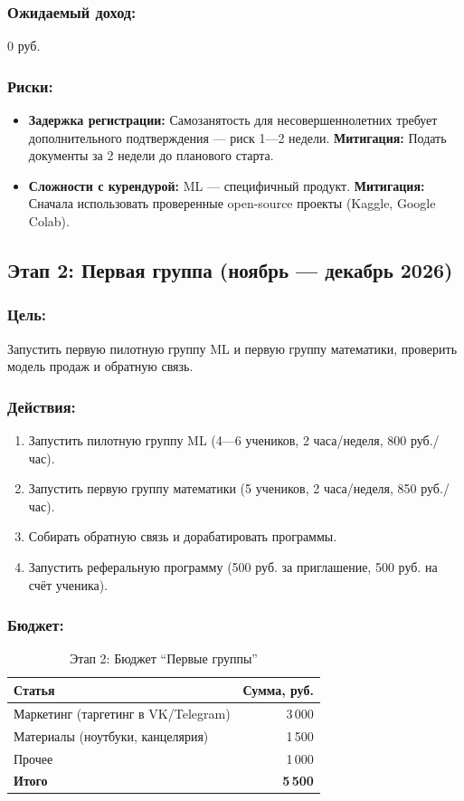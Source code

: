 \documentclass[12pt,a4paper]{article}
\begin{document}
\subsubsection*{Ожидаемый доход:} 0 руб.

\subsubsection*{Риски:}
\begin{itemize}
  \item \textbf{Задержка регистрации:} Самозанятость для несовершеннолетних требует дополнительного подтверждения --- риск 1---2 недели. \textbf{Митигация:} Подать документы за 2 недели до планового старта.
  \item \textbf{Сложности с курендурой:} ML --- специфичный продукт. \textbf{Митигация:} Сначала использовать проверенные open-source проекты (Kaggle, Google Colab).
\end{itemize}

\subsection{Этап 2: Первая группа (ноябрь --- декабрь 2026)}

\subsubsection*{Цель:}
Запустить первую пилотную группу ML и первую группу математики, проверить модель продаж и обратную связь.

\subsubsection*{Действия:}
\begin{enumerate}
  \item Запустить пилотную группу ML (4---6 учеников, 2 часа/неделя, 800 руб./час).
  \item Запустить первую группу математики (5 учеников, 2 часа/неделя, 850 руб./час).
  \item Собирать обратную связь и дорабатировать программы.
  \item Запустить реферальную программу (500 руб. за приглашение, 500 руб. на счёт ученика).
\end{enumerate}

\subsubsection*{Бюджет:}
\begin{table}[H]
\centering
\caption{Этап 2: Бюджет ``Первые группы''}
\begin{tabular}{lr}
\toprule
Статья & Сумма, руб. \\
\midrule
Маркетинг (таргетинг в VK/Telegram) & 3\,000 \\
Материалы (ноутбуки, канцелярия) & 1\,500 \\
Прочее & 1\,000 \\
\midrule
\textbf{Итого} & \textbf{5\,500} \\
\bottomrule
\end{tabular}
\end{table}
\end{document}
